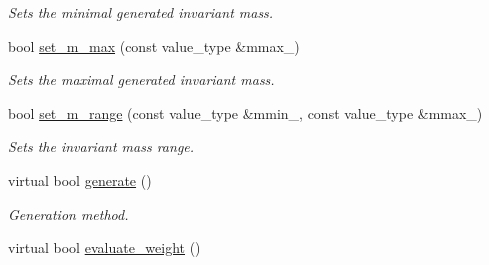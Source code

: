 \begin{DoxyCompactItemize}
\begin{DoxyCompactList}\small\item\em Sets the minimal generated invariant mass. \end{DoxyCompactList}\item 
\hypertarget{a00482_a5df44d35199be994a86c11ba77e98977}{bool \hyperlink{a00482_a5df44d35199be994a86c11ba77e98977}{set\-\_\-m\-\_\-max} (const value\-\_\-type \&mmax\-\_\-)}\label{a00482_a5df44d35199be994a86c11ba77e98977}

\begin{DoxyCompactList}\small\item\em Sets the maximal generated invariant mass. \end{DoxyCompactList}\item 
\hypertarget{a00482_a20f09719b50759cf0a7d9367d399820d}{bool \hyperlink{a00482_a20f09719b50759cf0a7d9367d399820d}{set\-\_\-m\-\_\-range} (const value\-\_\-type \&mmin\-\_\-, const value\-\_\-type \&mmax\-\_\-)}\label{a00482_a20f09719b50759cf0a7d9367d399820d}

\begin{DoxyCompactList}\small\item\em Sets the invariant mass range. \end{DoxyCompactList}\item 
\hypertarget{a00482_a92f18cd4c4b7dc331e9fdfae409e4d08}{virtual bool \hyperlink{a00482_a92f18cd4c4b7dc331e9fdfae409e4d08}{generate} ()}\label{a00482_a92f18cd4c4b7dc331e9fdfae409e4d08}

\begin{DoxyCompactList}\small\item\em Generation method. \end{DoxyCompactList}\item 
\hypertarget{a00482_a81ef54bd4a9621ccd88f7536d72bba59}{virtual bool \hyperlink{a00482_a81ef54bd4a9621ccd88f7536d72bba59}{evaluate\-\_\-weight} ()}\label{a00482_a81ef54bd4a9621ccd88f7536d72bba59}


\end{DoxyCompactItemize}
